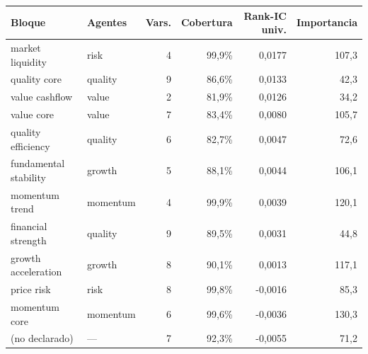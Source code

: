 \begin{tabular}{llrrrr}
\toprule
Bloque & Agentes & Vars. & Cobertura & Rank-IC univ. & Importancia \\
\midrule
market liquidity & risk & 4 & 99,9\% & 0,0177 & 107,3 \\
quality core & quality & 9 & 86,6\% & 0,0133 & 42,3 \\
value cashflow & value & 2 & 81,9\% & 0,0126 & 34,2 \\
value core & value & 7 & 83,4\% & 0,0080 & 105,7 \\
quality efficiency & quality & 6 & 82,7\% & 0,0047 & 72,6 \\
fundamental stability & growth & 5 & 88,1\% & 0,0044 & 106,1 \\
momentum trend & momentum & 4 & 99,9\% & 0,0039 & 120,1 \\
financial strength & quality & 9 & 89,5\% & 0,0031 & 44,8 \\
growth acceleration & growth & 8 & 90,1\% & 0,0013 & 117,1 \\
price risk & risk & 8 & 99,8\% & -0,0016 & 85,3 \\
momentum core & momentum & 6 & 99,6\% & -0,0036 & 130,3 \\
(no declarado) & — & 7 & 92,3\% & -0,0055 & 71,2 \\
\bottomrule
\end{tabular}
